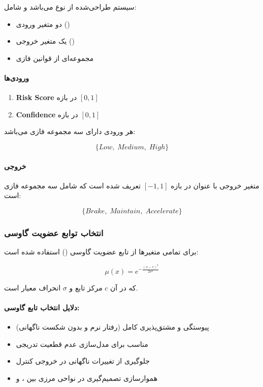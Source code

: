 \documentclass[a4paper, 10pt, twocolumn]{article}
\begin{document}
	سیستم طراحی‌شده از نوع  می‌باشد و شامل:
	
	\begin{itemize}
		\item دو متغیر ورودی ()
		\item یک متغیر خروجی ()
		\item مجموعه‌ای از قوانین فازی
	\end{itemize}
	
	\paragraph{ورودی‌ها}
	
	\begin{enumerate}
		\item \textbf{Risk Score} در بازه $[0,1]$
		\item \textbf{Confidence} در بازه $[0,1]$
	\end{enumerate}
	
	هر ورودی دارای سه مجموعه فازی می‌باشد:
	
	\[
	\{Low,\; Medium,\; High\}
	\]
	
	\paragraph{خروجی}
	
	متغیر خروجی با عنوان  در بازه $[-1,1]$ تعریف شده است که شامل سه مجموعه فازی است:
	
	\[
	\{Brake,\; Maintain,\; Accelerate\}
	\]
	
	
	\subsubsection{انتخاب توابع عضویت گاوسی}
	
	برای تمامی متغیرها از تابع عضویت گاوسی () استفاده شده است:
	
	\[
	\mu(x) = e^{-\frac{(x-c)^2}{2\sigma^2}}
	\]
	
	که در آن $c$ مرکز تابع و $\sigma$ انحراف معیار است.
	
	\paragraph{دلایل انتخاب تابع گاوسی:}
	
	\begin{itemize}
		\item پیوستگی و مشتق‌پذیری کامل (رفتار نرم و بدون شکست ناگهانی)
		\item مناسب برای مدل‌سازی عدم قطعیت تدریجی
		\item جلوگیری از تغییرات ناگهانی در خروجی کنترل
		\item هموارسازی تصمیم‌گیری در نواحی مرزی بین ،  و 
	\end{itemize}
	
\end{document}
